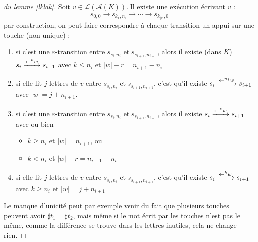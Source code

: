 \documentclass[12pt, a4paper]{article}
\renewcommand{\L}{\mathcal{L}}
\renewcommand{\bar}{\overline}
\newcommand{\A}{\mathcal{A}}
\begin{document}
    \begin{proof}[du lemme \ref{lklak}]
       Soit $v \in \L(\A(K))$. Il existe une exécution écrivant $v$ :
       \[ \overline{s_{0,0}} \rightarrow s_{k_1,n_1} \rightarrow \cdots \rightarrow s_{k_{|v|},0} \]
       par construction, on peut faire correspondre à chaque transition un appui sur une touche (non unique) :
       \begin{enumerate}
        \item si c'est une $\varepsilon$-transition entre $s_{s_i, n_i}$ et $s_{s_{i+1},n_{i+1}}$, alors il existe (dans $K$) $s_i \xrightarrow{\mathord{\leftarrow}^{k}w} s_{i+1}$ avec $k \leqslant n_i$ et $|w| - r = n_{i+1} - n_i$
        \item si elle lit $j$ lettres de $v$ entre $s_{s_i,n_i}$ et $s_{s_{i+1},n_{i+1}}$, c'est qu'il existe $s_i \xrightarrow{\mathord{\leftarrow}^{n_i}w} s_{i+1}$ avec $|w| = j + n_{i+1}$.
        \item si c'est une $\varepsilon$-transition entre $\bar{s_{s_i, n_i}}$ et $\bar{s_{s_{i+1},n_{i+1}}}$, alors il existe $s_i \xrightarrow{\mathord{\leftarrow}^{k}w} s_{i+1}$ avec ou bien
            \begin{itemize}
                \item $k \geqslant n_i$ et $|w| = n_{i+1}$, ou
                \item $k < n_i$ et $|w| - r = n_{i+1} - n_i$
            \end{itemize}
        \item si elle lit $j$ lettres de $v$ entre $\bar{s_{s_i,n_i}}$ et $s_{s_{i+1},n_{i+1}}$, c'est qu'il existe $s_i \xrightarrow{\mathord{\leftarrow}^{k}w} s_{i+1}$ avec $k \geqslant n_i$ et $|w| = j + n_{i+1}$
       \end{enumerate}
       Le manque d'unicité peut par exemple venir du fait que plusieurs touches peuvent avoir $\sharp t_1 = \sharp t_2$, mais même si le mot écrit par les touches n'est pas le même, comme la différence se trouve dans les lettres inutiles, cela ne change rien.


\end{proof}
\end{document}
